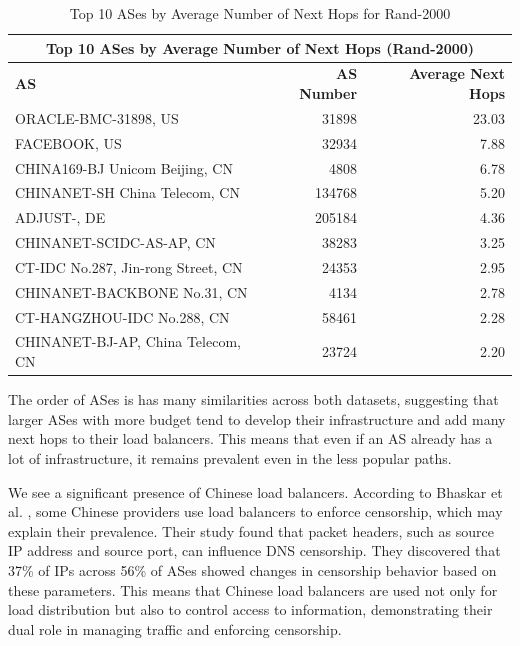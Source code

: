\documentclass[12pt]{cwru_thesis}
\begin{document}
\begin{table}[h!]
    \centering
    \begin{tabularx}{\textwidth}{|X|r|r|}
        \hline
        \multicolumn{3}{|c|}{\textbf{Top 10 ASes by Average Number of Next Hops (Rand-2000)}} \\
        \hline
        \textbf{AS} & \textbf{AS Number} & \textbf{Average Next Hops} \\
        \hline
        ORACLE-BMC-31898, US & 31898 & 23.03 \\
        FACEBOOK, US & 32934 & 7.88 \\
        CHINA169-BJ Unicom Beijing, CN & 4808 & 6.78 \\
        CHINANET-SH China Telecom, CN & 134768 & 5.20 \\
        ADJUST-, DE & 205184 & 4.36 \\
        CHINANET-SCIDC-AS-AP, CN & 38283 & 3.25 \\
        CT-IDC No.287, Jin-rong Street, CN & 24353 & 2.95 \\
        CHINANET-BACKBONE No.31, CN & 4134 & 2.78 \\
        CT-HANGZHOU-IDC No.288, CN & 58461 & 2.28 \\
        CHINANET-BJ-AP, China Telecom, CN & 23724 & 2.20 \\
        \hline
    \end{tabularx}
    \caption{Top 10 ASes by Average Number of Next Hops for Rand-2000}
    \label{tab:rand2000_as_next_hops}
\end{table}


The order of ASes is has many similarities across both datasets, suggesting that larger ASes with more budget tend to develop their infrastructure and add many next hops to their load balancers. This means that even if an AS already has a lot of infrastructure, it remains prevalent even in the less popular paths.

We see a significant presence of Chinese load balancers. According to Bhaskar et al.  \cite{bhaskar2021}, some Chinese providers use load balancers to enforce censorship, which may explain their prevalence. Their study found that packet headers, such as source IP address and source port, can influence DNS censorship. They discovered that 37\% of IPs across 56\% of ASes showed changes in censorship behavior based on these parameters. This means that Chinese load balancers are used not only for load distribution but also to control access to information, demonstrating their dual role in managing traffic and enforcing censorship.
\end{document}
